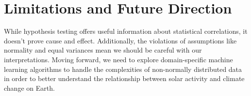 \documentclass{article}
\begin{document}
\section{Limitations and Future Direction}

While hypothesis testing offers useful information about statistical correlations, it doesn't prove cause and effect. Additionally, the violations of assumptions like normality and equal variances mean we should be careful with our interpretations. Moving forward, we need to explore domain-specific machine learning algorithms to handle the complexities of non-normally distributed data in order to better understand the relationship between solar activity and climate change on Earth.
\end{document}
